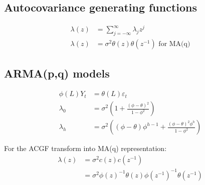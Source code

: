 \subsection{Autocovariance generating functions}

\begin{align*}
    \lambda(z)&=\sum_{j=-\infty}^{\infty} \lambda_j z^j \\
    \lambda(z)&=\sigma^2 \theta(z) \theta\left(z^{-1}\right) \text{ for MA(q)}
\end{align*}

\subsection{ARMA(p,q) models}

\begin{align*}
    \phi(L) Y_t&=\theta(L) \varepsilon_t \\
    \lambda_0&=\sigma^2\left(1+\frac{(\phi-\theta)^2}{1-\phi^2}\right) \\
    \lambda_h&=\sigma^2\left((\phi-\theta) \phi^{h-1}+\frac{(\phi-\theta)^2 \phi^h}{1-\phi^2}\right)
\end{align*}

For the ACGF transform into MA(q) representation:
\begin{align*}
    \lambda(z)&=\sigma^2 c(z) c\left(z^{-1}\right) \\
              &= \sigma^2 \phi(z)^{-1} \theta(z) \phi\left(z^{-1}\right)^{-1} \theta\left(z^{-1}\right)
\end{align*}